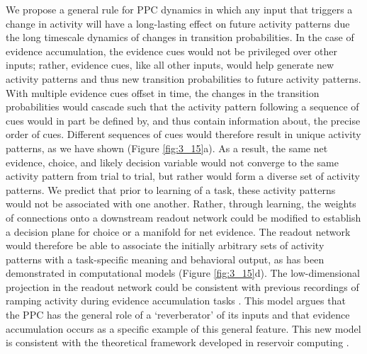 We propose a general rule for PPC dynamics in which any input that triggers a change in activity will have a long-lasting effect on future activity patterns due the long timescale dynamics of changes in transition probabilities. In the case of evidence accumulation, the evidence cues would not be privileged over other inputs; rather, evidence cues, like all other inputs, would help generate new activity patterns and thus new transition probabilities to future activity patterns. With multiple evidence cues offset in time, the changes in the transition probabilities would cascade such that the activity pattern following a sequence of cues would in part be defined by, and thus contain information about, the precise order of cues. Different sequences of cues would therefore result in unique activity patterns, as we have shown (Figure \ref{fig:3_15}a). As a result, the same net evidence, choice, and likely decision variable would not converge to the same activity pattern from trial to trial, but rather would form a diverse set of activity patterns. We predict that prior to learning of a task, these activity patterns would not be associated with one another. Rather, through learning, the weights of connections onto a downstream readout network could be modified to establish a decision plane for choice or a manifold for net evidence. The readout network would therefore be able to associate the initially arbitrary sets of activity patterns with a task-specific meaning and behavioral output, as has been demonstrated in computational models \citep{Buonomano:2009cw, Briggman:2005jd, Hoerzer:2014cz} (Figure \ref{fig:3_15}d). The low-dimensional projection in the readout network could be consistent with previous recordings of ramping activity during evidence accumulation tasks \citep{Shadlen:1996ga, Yang:2007in, Hanks:2015fy, Britten:1992wx, Horwitz:1999ws, Murakami:2014jl}. This model argues that the PPC has the general role of a ‘reverberator’ of its inputs and that evidence accumulation occurs as a specific example of this general feature. This new model is consistent with the theoretical framework developed in reservoir computing \citep{Jaeger:2004hj, Maass:2002kf, Buonomano:2009cw, Buonomano:1995fm, Verstraeten:2007jw}. 

